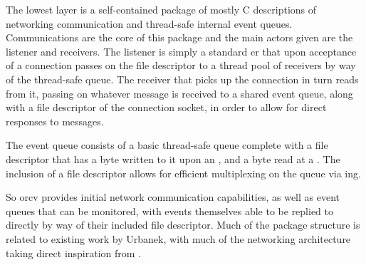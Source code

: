 The lowest layer is a self-contained package of mostly C descriptions of networking communication and thread-safe internal event queues.
Communications are the core of this package and the main actors given are the listener and receivers.
The listener is simply a standard er that upon acceptance of a connection passes on the file descriptor to a thread pool of receivers by way of the thread-safe queue.
The receiver that picks up the connection in turn reads from it, passing on whatever message is received to a shared event queue, along with a file descriptor of the connection socket, in order to allow for direct responses to messages.

The event queue consists of a basic thread-safe queue complete with a file descriptor that has a byte written to it upon an , and a byte read at a .
The inclusion of a file descriptor allows for efficient multiplexing on the queue via ing.

So orcv provides initial network communication capabilities, as well as event queues that can be monitored, with events themselves able to be replied to directly by way of their included file descriptor.
Much of the package structure is related to existing work by Urbanek, with much of the networking architecture taking direct inspiration from \textcite{stevens1997network}.
